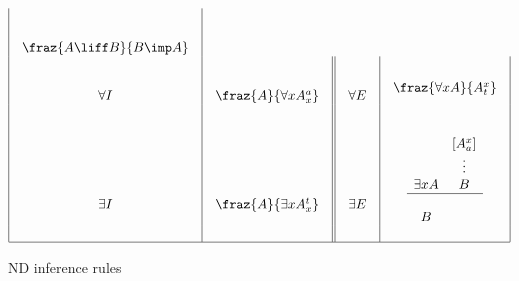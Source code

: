 \begin{figure}[htbp]
\[\begin{array}{|c|c||c|c|}
\begin{array}{c}
	\\ \\
	\fraz{A \liff B}
	     {B \imp A}
	\end{array}
	\\
	\begin{array}{l}
	\\ \\
	\forall  I  
	\end{array}
	& 
	\begin{array}{c}
	\\ \\
	\fraz{A}
	     {\forall x A^{a}_{x}}
	\end{array}
	&
	\begin{array}{l}
	\\ \\
	\forall E
	\end{array}
	& 
	\begin{array}{c}
	\\
	\fraz{\forall x A}
	     {A^{x}_{t}}
	\end{array}
	\\
	\begin{array}{l}
	\\ \\ \\ \\ \\
	\exists  I  
	\end{array}
	& 
	\begin{array}{c}
	\\ \\ \\ \\ \\
	\fraz{A}
	     {\exists x A^{t}_{x}}
	\end{array}
	&
	\begin{array}{l}
	\\ \\ \\ \\ \\
	\exists E 
	\end{array}
	&
	\begin{array}{cc}
	\\ \\
	&{[A^{x}_{a}]}\\
	&\vdots\\
	\exists x A & B\\
	\hline\\
	B
	\end{array}
	\\ 
	&&& \\ \hline
	\end{array}
	\]
\caption{ND inference rules}
\label{fig-nd}
\end{figure}

